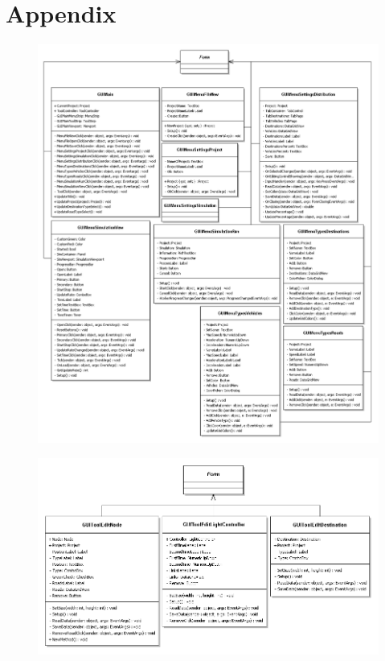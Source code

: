\chapter{Appendix}\label{[CHAPTER] Appendix}

\appendix


\begin{figure}[H]
\centering
\includegraphics[width=\textwidth,height=\textheight,keepaspectratio]{Pictures/Klassediagram/GUI}
\end{figure}\label{GUIBillede}



\begin{figure}[H]
\centering
\includegraphics[width=\textwidth,height=\textheight,keepaspectratio]{Pictures/Klassediagram/GUIEdit}
\end{figure}\label{GUIEditBillede}



